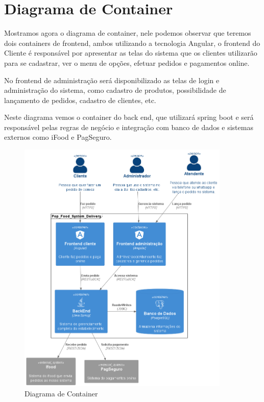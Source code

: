   \section{Diagrama de Container}
  Mostramos agora o diagrama de container, nele podemos observar que teremos dois containers de frontend,
  ambos utilizando a tecnologia Angular, o frontend do Cliente é responsável por apresentar as telas do sistema
  que os clientes utilizarão para se cadastrar, ver o menu de opções, efetuar pedidos e pagamentos online.

  No frontend de administração será disponibilizado as telas de login e administração do sistema, como cadastro de produtos, possibilidade de lançamento de pedidos,
  cadastro de clientes, etc.

  Neste diagrama vemos o container do back end, que utilizará spring boot e será responsável pelas regras de negócio e integração com banco de dados e sistemas externos como iFood e PagSeguro.

  \begin{figure}[h]
    \centering
    \includegraphics[width=0.9\textwidth]{diagrama_container.png}
    \caption{Diagrama de Container}
    \label{fig:Diagrama de Container}
  \end{figure}

